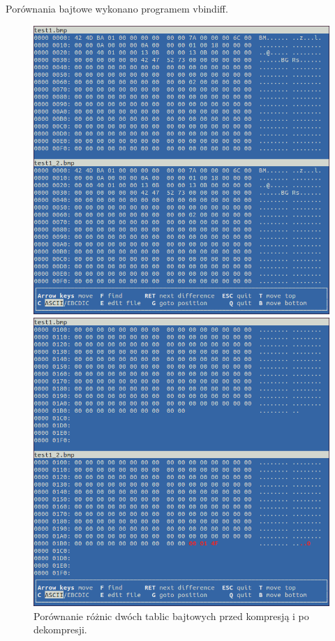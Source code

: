 \documentclass[12pt,a4paper,notitlepage]{report}
\begin{document}
Porównania bajtowe wykonano programem vbindiff\cite{diff}.
\begin{figure}[H]
	\centering
	\begin{minipage}{0.45\textwidth}
		\centering
		\includegraphics[scale=.3]{test1_beg}
	\end{minipage}\hfill
	\begin{minipage}{0.45\textwidth}
		\centering
		\includegraphics[scale=.3]{test1_end}
	\end{minipage}
	\caption{Porównanie różnic dwóch tablic bajtowych przed kompresją i po dekompresji.}
\end{figure}
\end{document}
